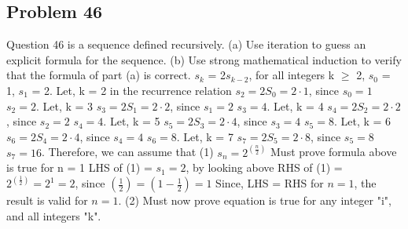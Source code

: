\documentclass{article}
\begin{document}
	\subsection*{Problem 46}
	Question 46 is a sequence defined recursively. (a) Use iteration
	to guess an explicit formula for the sequence. (b) Use strong
	mathematical induction to verify that the formula of part (a) is
	correct.
	\newline
	$s_{k}$ = 2$s_{k-2}$, for all integers k $\geq$ 2,
	\newline
	$s_{0}$ = 1, $s_{1}$ = 2.
	\newline
	Let, k = 2 in the recurrence relation
	\newline
	$s_{2} = 2S_{0} = 2 \cdot 1$, since $s_{0} = 1$
	\newline
	$s_{2} = 2$.
	\newline
	Let, k = 3
	\newline
	$s_{3} = 2S_{1} = 2 \cdot 2$, since $s_{1} = 2$
	\newline
	$s_{3} = 4$.
	\newline
	Let, k = 4
	\newline
	$s_{4} = 2S_{2} = 2 \cdot 2$, since $s_{2} = 2$
	\newline
	$s_{4} = 4$.
	\newline
	Let, k = 5
	\newline
	$s_{5} = 2S_{3} = 2 \cdot 4$, since $s_{3} = 4$
	\newline
	$s_{5} = 8$.
	\newline
	Let, k = 6
	\newline
	$s_{6} = 2S_{4} = 2 \cdot 4$, since $s_{4} = 4$
	\newline
	$s_{6} = 8$.
	\newline
	Let, k = 7
	\newline
	$s_{7} = 2S_{5} = 2 \cdot 8$, since $s_{5} = 8$
	\newline
	$s_{7} = 16$.
	\newline
	Therefore, we can assume that (1) $s_{n} = 2^{(\frac{n}{2})}$
	\newline
	Must prove formula above is true for n = 1
	\newline
	LHS of (1) = $s_{1} = 2$, by looking above
	\newline
	RHS of (1) = $2^{(\frac{1}{2})} = 2^{1} = 2$, since $(\frac{1}{2}) = (1 - \frac{1}{2}) = 1$
	\newline
	Since, LHS = RHS for $n = 1$, the result is valid for $n = 1$.
	\newline
	(2) Must now prove equation is true for any integer "i", and all integers "k".
\end{document}
